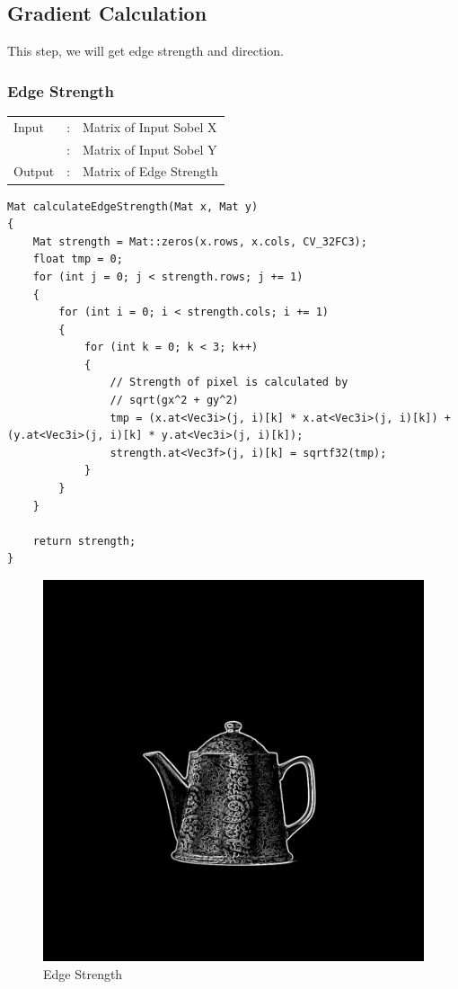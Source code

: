 \documentclass[12pt,a4paper]{report}
\begin{document}
\subsection{Gradient Calculation}
This step, we will get edge strength and direction.

\subsubsection{Edge Strength}
\begin{tabular}{lll}
    Input  & : & Matrix of Input Sobel X \\
           & : & Matrix of Input Sobel Y \\
    Output & : & Matrix of Edge Strength \\
\end{tabular}
\begin{lstlisting}
Mat calculateEdgeStrength(Mat x, Mat y)
{
    Mat strength = Mat::zeros(x.rows, x.cols, CV_32FC3);
    float tmp = 0;
    for (int j = 0; j < strength.rows; j += 1)
    {
        for (int i = 0; i < strength.cols; i += 1)
        {
            for (int k = 0; k < 3; k++)
            {
                // Strength of pixel is calculated by
                // sqrt(gx^2 + gy^2)
                tmp = (x.at<Vec3i>(j, i)[k] * x.at<Vec3i>(j, i)[k]) + (y.at<Vec3i>(j, i)[k] * y.at<Vec3i>(j, i)[k]);
                strength.at<Vec3f>(j, i)[k] = sqrtf32(tmp);
            }
        }
    }

    return strength;
}
\end{lstlisting}
\begin{figure}[!htb]
    \centering
      \includegraphics[height=0.4\paperheight]{output/magnitude.jpg}
    \caption{Edge Strength}
\end{figure}
\clearpage
\end{document}
